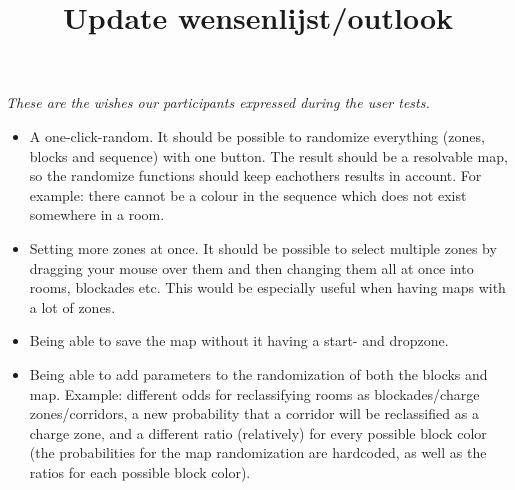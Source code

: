 \documentclass{article}
\title{Update wensenlijst/outlook}
\begin{document}
\maketitle

\textit{These are the wishes our participants expressed during the user tests.}
\\
\begin{itemize}
\item A one-click-random. It should be possible to randomize everything (zones, blocks and sequence) with one button. The result should be a resolvable map, so the randomize functions should keep eachothers results in account. For example: there cannot be a colour in the sequence which does not exist somewhere in a room.
\item Setting more zones at once. It should be possible to select multiple zones by dragging your mouse over them and then changing them all at once into rooms, blockades etc. This would be especially useful when having maps with a lot of zones. 
\item Being able to save the map without it having a start- and dropzone. 
\item Being able to add parameters to the randomization of both the blocks and map. Example: different odds for reclassifying rooms as blockades/charge zones/corridors, a new probability that a corridor will be reclassified as a charge zone, and a different ratio (relatively) for every possible block color (the probabilities for the map randomization are hardcoded, as well as the ratios for each possible block color).
\end{itemize}
\end{document}
